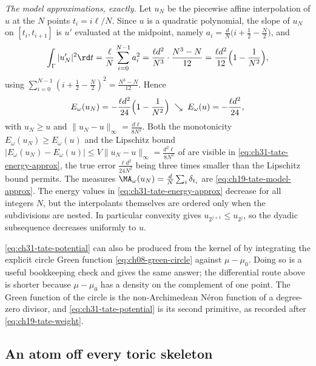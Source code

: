 \begin{example}
\emph{The model approximations, exactly.}  Let \(u_N\) be the piecewise
affine interpolation of \(u\) at the \(N\) points \(t_i=i\ell/N\).  Since
\(u\) is a quadratic polynomial, the slope of \(u_N\) on
\([t_i,t_{i+1}]\) is \(u'\) evaluated at the midpoint, namely
\(a_i=\tfrac dN\bigl(i+\tfrac12-\tfrac N2\bigr)\), and
\[
 \int_\Gamma|u_N'|^2\rd t
 =\frac\ell N\sum_{i=0}^{N-1}a_i^2
 =\frac{\ell d^2}{N^3}\cdot\frac{N^3-N}{12}
 =\frac{\ell d^2}{12}\Bigl(1-\frac1{N^2}\Bigr),
\]
using \(\sum_{i=0}^{N-1}(i+\tfrac12-\tfrac N2)^2=\tfrac{N^3-N}{12}\).
Hence
\begin{equation}
\label{eq:ch31-tate-energy-approx}
 E_\omega(u_N)=-\frac{\ell d^2}{24}\Bigl(1-\frac1{N^2}\Bigr)
 \;\searrow\;E_\omega(u)=-\frac{\ell d^2}{24},
\end{equation}
with \(u_N\geq u\) and \(\|u_N-u\|_\infty=\tfrac{d\ell}{8N^2}\).  Both the
monotonicity \(E_\omega(u_N)\geq E_\omega(u)\) and the Lipschitz bound
\(|E_\omega(u_N)-E_\omega(u)|\leq V\|u_N-u\|_\infty=\tfrac{d^2\ell}{8N^2}\)
of  are visible in
\eqref{eq:ch31-tate-energy-approx}, the true error \(\tfrac{\ell d^2}{24N^2}\)
being three times smaller than the Lipschitz bound permits.  The measures
\(\MA_\omega(u_N)=\tfrac dN\sum_i\delta_{t_i}\) are
\eqref{eq:ch19-tate-model-approx}.  The energy values in
\eqref{eq:ch31-tate-energy-approx} decrease for all integers \(N\), but the
interpolants themselves are ordered only when the subdivisions are nested.
In particular convexity gives \(u_{2^{j+1}}\leq u_{2^j}\), so the dyadic
subsequence decreases uniformly to \(u\).
\end{example}

\begin{remark}
\label{rem:ch31-circle-green}
\eqref{eq:ch31-tate-potential} can also be produced from the kernel of
 by integrating the explicit circle Green
function \eqref{eq:ch08-green-circle} against \(\mu-\mu_0\).  Doing so is a
useful bookkeeping check and gives the same answer; the differential
route above is shorter because \(\mu-\mu_0\) has a density on the
complement of one point.  The Green function of the circle is the
non-Archimedean N\'eron function of a degree-zero divisor, and
\eqref{eq:ch31-tate-potential} is its second primitive, as recorded after
\eqref{eq:ch19-tate-weight}.
\end{remark}

\subsection{An atom off every toric skeleton}
\label{sec:ch31-p1-blowup}

